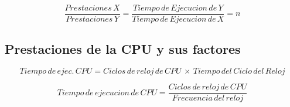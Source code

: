 \documentclass[12pt]{article}
\begin{document}
\begin{equation}
    \frac{Prestaciones\hspace{2pt}X}{Prestaciones\hspace{2pt}Y} = \frac{Tiempo\hspace{2pt}de\hspace{2pt}Ejecucion\hspace{2pt}de\hspace{2pt}Y}{Tiempo\hspace{2pt}de\hspace{2pt}Ejecucion\hspace{2pt}de\hspace{2pt}X} = n
\end{equation}

\subsection*{Prestaciones de la CPU y sus factores}

\begin{equation}  Tiempo\hspace{2pt}de\hspace{2pt}ejec.\hspace{2pt}CPU=Ciclos\hspace{2pt}de\hspace{2pt}reloj\hspace{2pt}de\hspace{2pt}CPU\hspace{2pt}\times\hspace{2pt}Tiempo\hspace{2pt}del\hspace{2pt}Ciclo\hspace{2pt}del\hspace{2pt}Reloj
\end{equation}

\begin{equation}
    Tiempo\hspace{2pt}de\hspace{2pt}ejecucion\hspace{2pt}de\hspace{2pt} CPU = \frac{Ciclos\hspace{2pt}de\hspace{2pt}reloj\hspace{2pt}de\hspace{2pt}CPU}{Frecuencia\hspace{2pt}del\hspace{2pt}reloj}
\end{equation}
\end{document}
